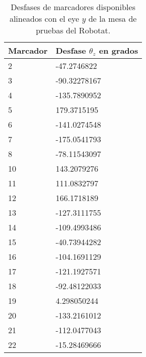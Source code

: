 \begin{table}[H]
	\centering
	\begin{tabular}{|l|l|}
		\hline
		\textbf{Marcador} & \textbf{Desfase  $\theta_z$ en grados} \\ \hline
		2 & -47.2746822 \\ \hline
		3 & -90.32278167 \\ \hline
		4 & -135.7890952 \\ \hline
		5 & 179.3715195 \\ \hline
		6 & -141.0274548 \\ \hline
		7 & -175.0541793 \\ \hline
		8 & -78.11543097 \\ \hline
		10 & 143.2079276 \\ \hline
		11 & 111.0832797 \\ \hline
		12 & 166.1718189 \\ \hline
		13 & -127.3111755 \\ \hline
		14 & -109.4993486 \\ \hline
		15 & -40.73944282 \\ \hline
		16 & -104.1691129 \\ \hline
		17 & -121.1927571 \\ \hline
		18 & -92.48122033 \\ \hline
		19 & 4.298050244 \\ \hline
		20 & -133.2161012 \\ \hline
		21 & -112.0477043 \\ \hline
		22 & -15.28469666 \\ \hline
	\end{tabular}
	\caption{Desfases de marcadores disponibles alineados con el eye $y$ de la mesa de pruebas del Robotat.}
	\label{cuadro:desfases_iniciales}
\end{table}

